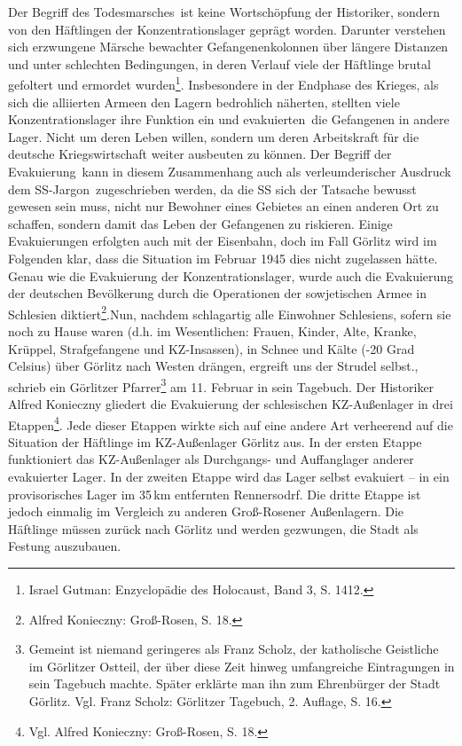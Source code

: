 
Der Begriff des \glqq Todesmarsches\grqq~ist keine Wortschöpfung der Historiker, sondern von den Häftlingen der Konzentrationslager geprägt worden. Darunter verstehen sich erzwungene Märsche bewachter Gefangenenkolonnen über längere Distanzen und unter schlechten Bedingungen, in deren Verlauf viele der Häftlinge brutal gefoltert und ermordet wurden\footnote{Israel Gutman: Enzyclopädie des Holocaust, Band 3, S. 1412.}. Insbesondere in der Endphase des Krieges, als sich die alliierten Armeen den Lagern bedrohlich näherten, stellten viele Konzentrationslager ihre Funktion ein und \glqq evakuierten\grqq~die Gefangenen in andere Lager. Nicht um deren Leben willen, sondern um deren Arbeitskraft für die deutsche Kriegswirtschaft weiter ausbeuten zu können. Der Begriff der \glqq Evakuierung\grqq~kann in diesem Zusammenhang auch als verleumderischer Ausdruck dem \glqq SS-Jargon\grqq~zugeschrieben werden, da die SS sich der Tatsache bewusst gewesen sein muss, nicht nur Bewohner eines Gebietes an einen anderen Ort zu schaffen, sondern damit das Leben der Gefangenen zu riskieren. Einige Evakuierungen erfolgten auch mit der Eisenbahn, doch im Fall Görlitz wird im Folgenden klar, dass die Situation im Februar 1945 dies nicht zugelassen hätte.\newline
Genau wie die Evakuierung der Konzentrationslager, wurde auch die Evakuierung der deutschen Bevölkerung durch die Operationen der sowjetischen Armee in Schlesien diktiert\footnote{Alfred Konieczny: Groß-Rosen, S. 18.}.\glqq Nun, nachdem schlagartig alle Einwohner Schlesiens, sofern sie noch zu Hause waren (d.h. im Wesentlichen: Frauen, Kinder, Alte, Kranke, Krüppel, Strafgefangene und KZ-Insassen), in Schnee und Kälte (-20 Grad Celsius) über Görlitz nach Westen drängen, ergreift uns der Strudel selbst.\grqq, schrieb ein Görlitzer Pfarrer\footnote{Gemeint ist niemand geringeres als Franz Scholz, der katholische Geistliche im Görlitzer Ostteil, der über diese Zeit hinweg umfangreiche Eintragungen in sein Tagebuch machte. Später erklärte man ihn zum Ehrenbürger der Stadt Görlitz. Vgl. Franz Scholz: Görlitzer Tagebuch, 2. Auflage, S. 16.} am 11. Februar in sein Tagebuch. 
Der Historiker Alfred Konieczny gliedert die Evakuierung der schlesischen KZ-Außenlager in drei Etappen\footnote{Vgl. Alfred Konieczny: Groß-Rosen, S. 18.}. Jede dieser Etappen wirkte sich auf eine andere Art verheerend auf die Situation der Häftlinge im KZ-Außenlager Görlitz aus. In der ersten Etappe funktioniert das KZ-Außenlager als Durchgangs- und Auffanglager anderer evakuierter Lager. In der zweiten Etappe wird das Lager selbst evakuiert -- in ein provisorisches Lager im 35\,km entfernten Rennersodrf. Die dritte Etappe ist jedoch einmalig im Vergleich zu anderen Groß-Rosener Außenlagern. Die Häftlinge müssen zurück nach Görlitz und werden gezwungen, die Stadt als Festung auszubauen. 



